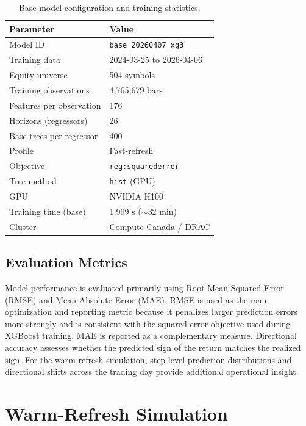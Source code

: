 \documentclass[conference]{IEEEtran}
\begin{document}
\begin{table}[h]
\centering
\caption{Base model configuration and training statistics.}
\label{tab:basemodel}
\begin{tabular}{ll}
\hline
\textbf{Parameter} & \textbf{Value} \\
\hline
Model ID & \texttt{base\_20260407\_xg3} \\
Training data & 2024-03-25 to 2026-04-06 \\
Equity universe & 504 symbols \\
Training observations & 4{,}765{,}679 bars \\
Features per observation & 176 \\
Horizons (regressors) & 26 \\
Base trees per regressor & 400 \\
Profile & Fast-refresh \\
Objective & \texttt{reg:squarederror} \\
Tree method & \texttt{hist} (GPU) \\
GPU & NVIDIA H100 \\
Training time (base) & 1{,}909 s ($\sim$32 min) \\
Cluster & Compute Canada / DRAC \\
\hline
\end{tabular}
\end{table}

\subsection{Evaluation Metrics}

Model performance is evaluated primarily using Root Mean Squared Error (RMSE) and Mean Absolute Error (MAE). RMSE is used as the main optimization and reporting metric because it penalizes larger prediction errors more strongly and is consistent with the squared-error objective used during XGBoost training. MAE is reported as a complementary measure. Directional accuracy assesses whether the predicted sign of the return matches the realized sign. For the warm-refresh simulation, step-level prediction distributions and directional shifts across the trading day provide additional operational insight.

\section{Warm-Refresh Simulation}\label{sec:warmrefresh}
\end{document}
